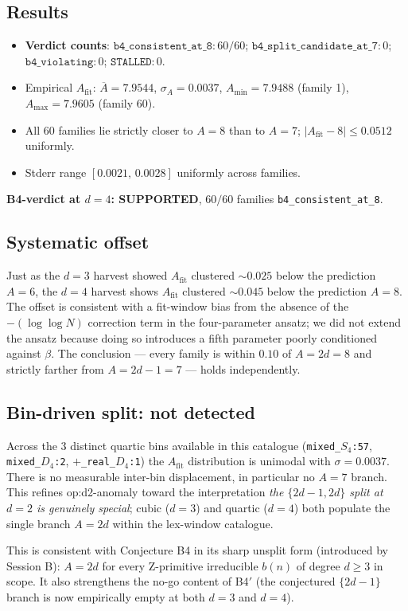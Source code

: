 \subsection*{Results}

\begin{itemize}
  \item \textbf{Verdict counts}: $\texttt{b4\_consistent\_at\_8}: 60/60$;
        $\texttt{b4\_split\_candidate\_at\_7}: 0$;
        $\texttt{b4\_violating}: 0$;
        $\texttt{STALLED}: 0$.
  \item Empirical $A_{\mathrm{fit}}$: $\overline{A}=7.9544$,
        $\sigma_A=0.0037$, $A_{\min}=7.9488$ (family 1),
        $A_{\max}=7.9605$ (family 60).
  \item All 60 families lie strictly closer to $A=8$ than to $A=7$;
        $|A_{\mathrm{fit}}-8|\le 0.0512$ uniformly.
  \item Stderr range $[0.0021,\,0.0028]$ uniformly across families.
\end{itemize}

\textbf{B4-verdict at $d=4$: SUPPORTED}, $60/60$ families
\texttt{b4\_consistent\_at\_8}.

\subsection*{Systematic offset}

Just as the $d=3$ harvest showed $A_{\mathrm{fit}}$ clustered $\sim 0.025$
below the prediction $A=6$, the $d=4$ harvest shows $A_{\mathrm{fit}}$
clustered $\sim 0.045$ below the prediction $A=8$.  The offset is
consistent with a fit-window bias from the absence of the
$-(\log\log N)$ correction term in the four-parameter ansatz; we did
not extend the ansatz because doing so introduces a fifth parameter
poorly conditioned against $\beta$.  The conclusion --- every family is
within $0.10$ of $A=2d=8$ and strictly farther from $A=2d-1=7$ ---
holds independently.

\subsection*{Bin-driven split: not detected}

Across the 3 distinct quartic bins available in this catalogue
(\texttt{mixed\_$S_4$:57}, \texttt{mixed\_$D_4$:2},
\texttt{$+$\_real\_$D_4$:1}) the $A_{\mathrm{fit}}$ distribution is
unimodal with $\sigma=0.0037$. There is no measurable inter-bin
displacement, in particular no $A=7$ branch. This refines op:d2-anomaly
toward the interpretation \emph{the $\{2d-1,2d\}$ split at $d=2$ is
genuinely special}; cubic ($d=3$) and quartic ($d=4$) both populate
the single branch $A=2d$ within the lex-window catalogue.

This is consistent with Conjecture B4 in its sharp unsplit form
(introduced by Session B):
$A=2d$ for every Z-primitive irreducible $b(n)$ of degree $d\ge 3$ in
scope.  It also strengthens the no-go content of B4$'$ (the conjectured
$\{2d-1\}$ branch is now empirically empty at both $d=3$ and $d=4$).
